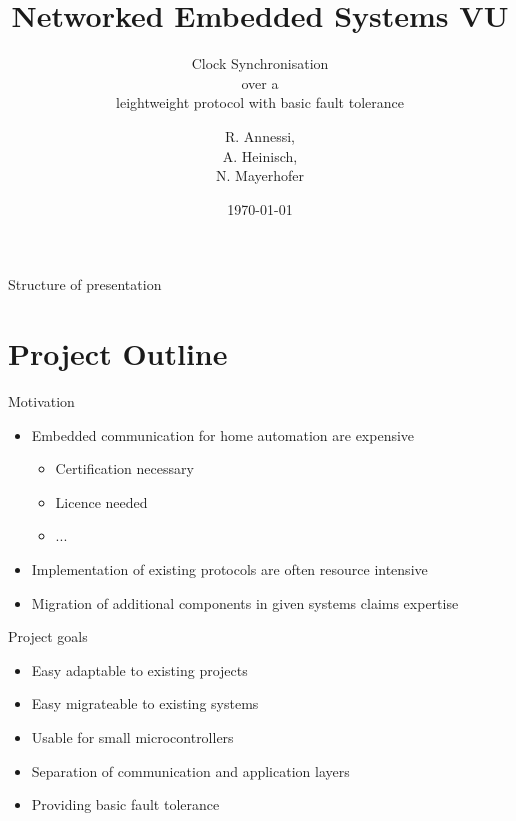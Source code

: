 \documentclass{beamer}
\title {Networked Embedded Systems VU}
\subtitle {Clock Synchronisation\\over a\\ leightweight protocol with basic fault tolerance}
\author{R. Annessi,\\ A. Heinisch,\\ N. Mayerhofer}
\date{\customdate\today}
\begin{document}
\begin{frame}
  \titlepage
\end{frame}
 \logo{}

\begin{frame}{Structure of presentation}
  \tableofcontents
\end{frame}


\section{Project Outline}
\begin{frame}{Motivation}
\begin{center}
\begin{itemize}
  \item Embedded communication for home automation are expensive
    \begin{itemize}
      \item Certification necessary
      \item Licence needed
      \item ...
    \end{itemize}
  \item Implementation of existing protocols are often resource intensive
  \item Migration of additional components in given systems claims expertise
\end{itemize}
\end{center}
\end{frame}

\begin{frame}{Project goals}
\begin{center}
\begin{itemize}
 \item \begin{large}Easy adaptable to existing projects\end{large}
 \item \begin{large}Easy migrateable to existing systems\end{large}
 \item \begin{large}Usable for small microcontrollers\end{large}
 \item \begin{large}Separation of communication and application layers\end{large}
 \item \begin{large}Providing basic fault tolerance\end{large}
\end{itemize}
\end{center}
\end{frame}
\end{document}
